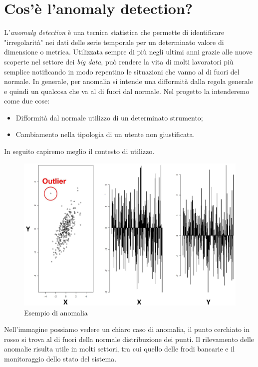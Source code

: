 \section{Cos'è l'anomaly detection?}
L'\emph{anomaly detection} è una tecnica statistica che permette di identificare "irregolarità" nei dati delle serie temporale per un determinato valore di dimensione o metrica. 
Utilizzata sempre di più negli ultimi anni grazie alle nuove scoperte nel settore dei \emph{big data}, può rendere la vita di molti lavoratori più semplice notificando in modo repentino le situazioni che vanno al di fuori del normale.
In generale, per anomalia si intende una difformità dalla regola generale e quindi un qualcosa che va al di fuori dal normale. Nel progetto la intenderemo come due cose:
\begin{itemize}
	\item [] Difformità dal normale utilizzo di un determinato strumento;
	\item [] Cambiamento nella tipologia di un utente non giustificata.
\end{itemize}
In seguito capiremo meglio il contesto di utilizzo.
\newpage
\begin{figure}[h!]
	\centering
	\includegraphics[scale=0.1]{figures/anomaly_detection_example}
	\caption[Esempio di anomalia.]{Esempio di anomalia \cite{anomalydetection}
		\label{fig:anomalia}}
\end{figure}	

Nell'immagine possiamo vedere un chiaro caso di anomalia, il punto cerchiato in rosso si trova al di fuori della normale distribuzione dei punti.
Il rilevamento delle anomalie risulta utile in molti settori, tra cui quello delle frodi bancarie e il monitoraggio dello stato del sistema. 
